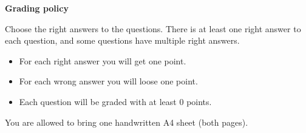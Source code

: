 \documentclass[12pt,answers]{exam}
\begin{document}
    \begin{center}
    \end{center}

    \vspace{5mm}

    \vspace{5mm}

    \begin{tcolorbox}[colback=white, colframe=black, boxrule=0.8pt]
        \begin{center}
            {\textbf{Grading policy}}
        \end{center}
        Choose the right answers to the questions.
        There is at least one right answer to each question, and some questions have multiple right answers.
        \begin{itemize}
            \item For each right answer you will get one point.
            \item For each wrong answer you will loose one point.
            \item Each question will be graded with at least $0$ points.
        \end{itemize}
        You are allowed to bring one handwritten A4 sheet (both pages).
    \end{tcolorbox}
\end{document}
